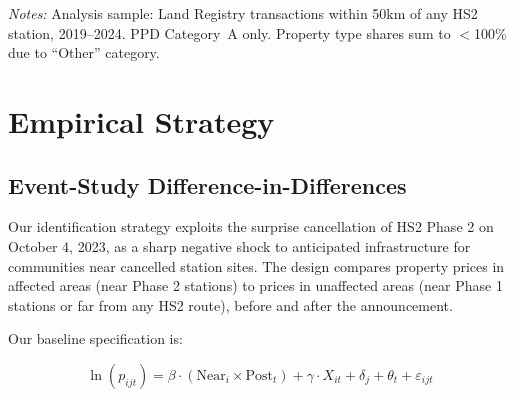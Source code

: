 \documentclass[12pt]{article}
\begin{document}
\begin{table}[H]
\centering
\caption{Summary Statistics by Treatment Group}
\par\vspace{0.5em}\noindent\small{\textit{Notes:} Analysis sample: Land Registry transactions within 50km of any HS2 station, 2019--2024. PPD Category~A only. Property type shares sum to $<$100\% due to ``Other'' category.}
\label{tab:summary}
\end{table}


\section{Empirical Strategy}

\subsection{Event-Study Difference-in-Differences}

Our identification strategy exploits the surprise cancellation of HS2 Phase 2 on October 4, 2023, as a sharp negative shock to anticipated infrastructure for communities near cancelled station sites. The design compares property prices in affected areas (near Phase 2 stations) to prices in unaffected areas (near Phase 1 stations or far from any HS2 route), before and after the announcement.

Our baseline specification is:

\begin{equation}
\ln(p_{ijt}) = \beta \cdot (\text{Near}_{i} \times \text{Post}_{t}) + \gamma \cdot X_{it} + \delta_j + \theta_t + \varepsilon_{ijt}
\label{eq:did}
\end{equation}
\end{document}
